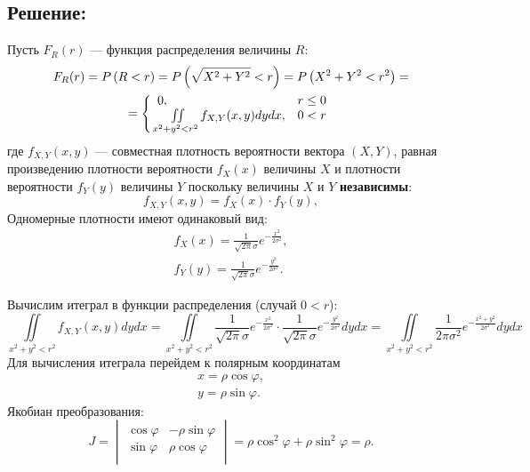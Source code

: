 \subsection*{Решение:}
Пусть $F_R(r)$ --- функция распределения величины $R$:
\begin{multline}
    F_R(r)
    = P \left ( R < r \right )
    = P \left ( \sqrt{X^2 + Y^2} < r \right )
    = P \left ( X^2 + Y^2 < r^2 \right ) = \\
    = \left \{
    \begin{array}{ll}
        0,                                                   & r \le 0 \\
        \iint \limits_{x^2 + y^2 < r^2} f_{X,Y}(x, y) dy dx, & 0 < r   \\
    \end{array}
    \right .
\end{multline}
где $f_{X,Y}(x, y)$ --- совместная плотность вероятности вектора $\left ( X, Y \right )$, равная произведению плотности вероятности $f_X(x)$ величины $X$ и
плотности вероятности $f_Y(y)$ величины $Y$ поскольку величины $X$ и $Y$ \textbf{независимы}:
\begin{equation}
    f_{X,Y}(x, y) = f_X(x) \cdot f_Y(y),
\end{equation}
Одномерные плотности имеют одинаковый вид:
\begin{gather}
    f_X(x) = \frac{1}{\sqrt{2 \pi} \sigma} e^{- \frac{x^2}{2 \sigma^2}} , \\
    f_Y(y) = \frac{1}{\sqrt{2 \pi} \sigma} e^{- \frac{y^2}{2 \sigma^2}} .
\end{gather}

Вычислим итеграл в функции распределения (случай $0 < r$):
\begin{equation}
    \iint \limits_{x^2 + y^2 < r^2} f_{X,Y}(x, y) dy dx
    = \iint \limits_{x^2 + y^2 < r^2} \frac{1}{\sqrt{2 \pi} \sigma} e^{- \frac{x^2}{2 \sigma^2}} \cdot \frac{1}{\sqrt{2 \pi} \sigma} e^{- \frac{y^2}{2 \sigma^2}} dy dx
    = \iint \limits_{x^2 + y^2 < r^2} \frac{1}{2 \pi \sigma^2} e^{- \frac{x^2 + y^2}{2 \sigma^2}} dy dx
\end{equation}
Для вычисления итеграла перейдем к полярным координатам
\begin{gather}
    x = \rho \cos \varphi , \\
    y = \rho \sin \varphi .
\end{gather}
Якобиан преобразования:
\begin{equation}
    J
    = \begin{vmatrix}
          \cos \varphi & - \rho \sin \varphi \\
          \sin \varphi & \rho \cos \varphi   \\
    \end{vmatrix}
    = \rho \cos^2 \varphi + \rho \sin^2 \varphi = \rho
    .
\end{equation}

